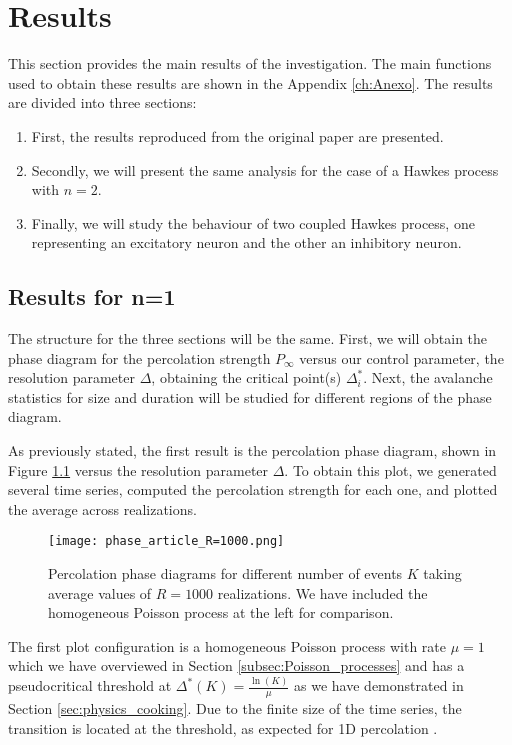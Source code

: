 \chapter{Results} \label{ch:resultados}

This section provides the main results of the investigation. The main functions used to obtain these results are shown in the Appendix \ref{ch:Anexo}. 
The results are divided into three sections:
\begin{enumerate}
    \item First, the results reproduced from the original paper \cite{notarmuzi2021percolation} are presented.
    \item Secondly, we will present the same analysis for the case of a Hawkes process with $n=2$.
    \item Finally, we will study the behaviour of two coupled Hawkes process, one representing an excitatory neuron and the other an inhibitory neuron.
\end{enumerate}

\section{Results for n=1}

The structure for the three sections will be the same. First, we will obtain the phase diagram for the percolation strength $P_{\infty}$ versus our control parameter, the resolution parameter 
$\Delta$, obtaining the critical point(s) $\Delta^*_{i}$. Next, the avalanche statistics for size and duration will be studied for different regions of the phase diagram.  

As previously stated, the first result is the percolation phase diagram, shown in Figure \ref{f:phase_diagram_article} 
versus the resolution parameter $\Delta$. To obtain this plot, we generated several time series, computed the percolation strength for each one, and plotted the average across realizations.

\begin{figure}[H]
    \centering
    \texttt{[image: phase\_article\_R=1000.png]}
    \caption{Percolation phase diagrams for different number of events $K$ taking average values of $R=1000$ realizations. We have included the homogeneous Poisson process at the left for 
    comparison.}
    \label{f:phase_diagram_article}
\end{figure}

The first plot configuration is a homogeneous Poisson process with rate $\mu=1$ which we have overviewed in Section \ref{subsec:Poisson_processes} and has a pseudocritical threshold at 
$\Delta^*(K)=\frac{\ln(K)}{\mu}$ as we have demonstrated in Section \ref{sec:physics_cooking}. Due to the finite size of the time series, the transition is located at 
the threshold, as expected for 1D percolation \cite{stauffer2018introduction}.

